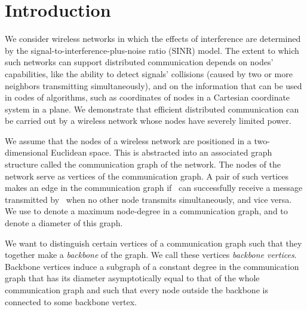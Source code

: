 \documentclass[11pt]{article}
\begin{document}
\vfill


\thispagestyle{empty}

\setcounter{page}{0}

\newpage



\section{Introduction}
\label{intro}

We consider wireless networks in which the effects of interference are determined by the signal-to-interference-plus-noise ratio (SINR) model. 
The extent to which such networks can support distributed communication depends on nodes' capabilities, like the ability to detect signals' collisions (caused by two or more neighbors transmitting simultaneously), and on the information that can be used in codes of algorithms, such as coordinates of nodes in a Cartesian coordinate system in a plane.
We demonstrate that efficient distributed communication can be carried out by a wireless network whose nodes have severely limited power.

We assume that the nodes of a wireless network are positioned in a two-dimensional Euclidean space.
This is abstracted into an associated graph structure called the communication graph of the network.
The  nodes of the network serve as vertices of the communication graph. 
A pair of such vertices   makes an edge in the communication graph if~ can successfully receive a message transmitted by~ when no other node transmits simultaneously, and vice versa. 
We use  to denote a maximum node-degree in a communication graph, and  to denote a  diameter of this graph.

We want to distinguish certain vertices of a communication graph such that they together make a \emph{backbone} of the graph.
We call these vertices  \emph{backbone vertices}. 
Backbone vertices induce a subgraph of a constant degree in the communication graph that has its diameter asymptotically equal to that of the whole communication graph and such that every node outside the backbone is connected to some backbone vertex.
\end{document}
